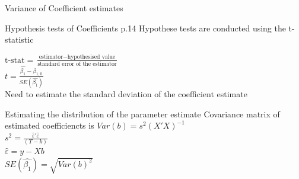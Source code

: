 \documentclass[14pt,xcolor=pdftex,dvipsnames,table]{beamer}\usepackage{graphicx, color}
\begin{document}
\begin{frame}{Variance of Coefficient estimates}
\graphicspath{{./Figures/}}
\begin{center}
\end{center}
\end{frame}

\begin{frame}{Hypothesis tests of Coefficients p.14}
Hypothese tests are conducted using the t-statistic
\begin{block}{}
$\text{t-stat} = \frac{\text{estimator} - \text{hypothesised value}}{\text{standard error of the estimator}}$\\ 
\vskip 0.5cm
$t = \frac{\hat{\beta_1}-\beta_{1,0}}{SE(\hat{\beta_1})}$\\
\vskip 0.5cm 
Need to estimate the standard deviation of the coefficient estimate
\end{block}
\end{frame}

\begin{frame}{Estimating the distribution of the parameter estimate}
Covariance matrix of estimated coefficiencts is
$Var(b) = s^2(X'X)^{-1}$\\
$s^2 = \frac{\hat{\varepsilon}'\hat{\varepsilon}}{(T - k)}$\\
$\hat{\varepsilon} = y - Xb$\\
$SE(\hat{\beta_1}) = \sqrt{Var(b)^2}$
\end{frame}
\end{document}
